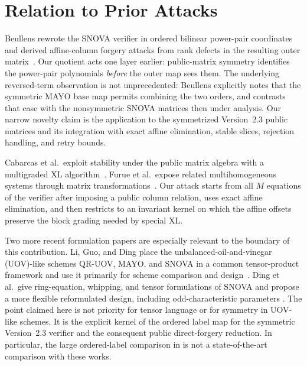 \documentclass[11pt]{article}
\newcommand{\SNOVA}{\textsf{SNOVA}}
\begin{document}
\section{Relation to Prior Attacks}\label{sec:related}

Beullens rewrote the \SNOVA{} verifier in ordered bilinear power-pair
coordinates and derived affine-column forgery attacks from rank defects in the
resulting outer matrix~\cite{Beullens2024SNOVA}.  Our quotient acts one layer
earlier: public-matrix symmetry identifies the power-pair polynomials
\emph{before} the outer map sees them.  The underlying reversed-term
observation is not unprecedented: Beullens explicitly notes that the
symmetric MAYO base map permits combining the two orders, and contrasts that
case with the nonsymmetric \SNOVA{} matrices then under analysis.  Our narrow
novelty claim is the application to the symmetrized Version~2.3 public
matrices and its integration with exact affine elimination, stable slices,
rejection handling, and retry bounds.

Cabarcas et al.\ exploit stability under the public matrix algebra with a
multigraded XL algorithm~\cite{Cabarcas2025SNOVA}.  Furue et al.\ expose related
multihomogeneous systems through matrix transformations~\cite{FurueEtAl2026}.
Our attack starts from all $M$ equations of the verifier after imposing a
public column relation, uses exact affine elimination, and then
restricts to an invariant kernel on which the affine offsets preserve the
block grading needed by special XL.\@

Two more recent formulation papers are especially relevant to the boundary of
this contribution.  Li, Guo, and Ding place the unbalanced-oil-and-vinegar
(UOV)-like schemes QR-UOV, MAYO, and \SNOVA{} in a common tensor-product
framework and use it primarily for scheme comparison and
design~\cite{LiGuoDing2025Unified}.  Ding et al.\ give ring-equation,
whipping, and tensor formulations of \SNOVA{} and propose a more flexible
reformulated design, including odd-characteristic parameters
\cite{DingEtAl2026Reformulating}.  The point claimed here is not priority for
tensor language or for symmetry in UOV-like schemes.  It is the explicit
kernel of the ordered label map for the symmetric Version~2.3 verifier and the
consequent public direct-forgery reduction.  In particular, the large
ordered-label comparison in  is not a
state-of-the-art comparison with these works.
\end{document}
